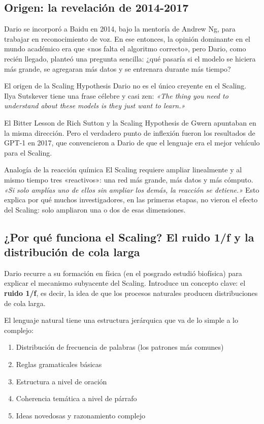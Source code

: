 \documentclass[a4paper]{article}
\begin{document}
\subsection{Origen: la revelación de 2014-2017}

Dario se incorporó a Baidu en 2014, bajo la mentoría de Andrew Ng, para trabajar en reconocimiento de voz. En ese entonces, la opinión dominante en el mundo académico era que «nos falta el algoritmo correcto», pero Dario, como recién llegado, planteó una pregunta sencilla: ¿qué pasaría si el modelo se hiciera más grande, se agregaran más datos y se entrenara durante más tiempo?

\begin{knowledgebox}{El origen de la Scaling Hypothesis}
Dario no es el único creyente en el Scaling. Ilya Sutskever tiene una frase célebre y casi zen: \textit{«The thing you need to understand about these models is they just want to learn.»}

El Bitter Lesson de Rich Sutton y la Scaling Hypothesis de Gwern apuntaban en la misma dirección. Pero el verdadero punto de inflexión fueron los resultados de GPT-1 en 2017, que convencieron a Dario de que el lenguaje era el mejor vehículo para el Scaling.
\end{knowledgebox}

\begin{importantbox}{Analogía de la reacción química}
El Scaling requiere ampliar linealmente y al mismo tiempo tres «reactivos»: una red más grande, más datos y más cómputo. \textit{«Si solo amplías uno de ellos sin ampliar los demás, la reacción se detiene.»} Esto explica por qué muchos investigadores, en las primeras etapas, no vieron el efecto del Scaling: solo ampliaron una o dos de esas dimensiones.
\end{importantbox}

\subsection{¿Por qué funciona el Scaling? El ruido 1/f y la distribución de cola larga}

Dario recurre a su formación en física (en el posgrado estudió biofísica) para explicar el mecanismo subyacente del Scaling. Introduce un concepto clave: el \textbf{ruido 1/f}, es decir, la idea de que los procesos naturales producen distribuciones de cola larga.

El lenguaje natural tiene una estructura jerárquica que va de lo simple a lo complejo:
\begin{enumerate}
    \item Distribución de frecuencia de palabras (los patrones más comunes)
    \item Reglas gramaticales básicas
    \item Estructura a nivel de oración
    \item Coherencia temática a nivel de párrafo
    \item Ideas novedosas y razonamiento complejo
\end{enumerate}
\end{document}
